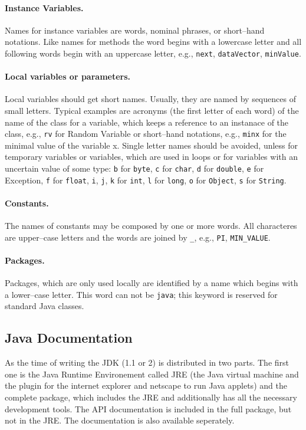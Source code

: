 \paragraph{Instance Variables.} Names for instance variables are
  words, nominal phrases, or short--hand notations. Like names for
  methods the word begins with a lowercase letter and all following
  words begin with an uppercase letter, e.g., \verb|next|,
  \verb|dataVector|,
\verb|minValue|.

\paragraph{Local variables or parameters.} Local variables should get
  short  names. Usually, they are named by sequences of small
  letters. Typical examples are acronyms (the first letter of each
  word) of the name of the class for a variable, which keeps a
  reference to an instanace of the class, e.g., \verb|rv| for Random
  Variable or short--hand notations, e.g., \verb|minx| for the minimal
  value of the variable x. Single letter names should be avoided,
  unless for temporary variables or variables, which are used in
  loops or for variables with an uncertain value of some type:
\verb|b| for \verb|byte|, \verb|c| for \verb|char|, \verb|d| for
  \verb|double|, \verb|e| for Exception, \verb|f| for \verb|float|,
  \verb|i|,
\verb|j|, \verb|k| for \verb|int|, \verb|l| for \verb|long|, \verb|o|
  for \verb|Object|, \verb|s| for \verb|String|.

\paragraph{Constants.} The names of constants may be composed by one
  or more words. All characteres are upper--case letters and the words
  are joined by \verb|_|, e.g., \verb|PI|,  \verb|MIN_VALUE|.

\paragraph{Packages.} Packages, which are only used locally are
  identified by a name which begins with a lower--case letter. This
  word can not be \verb|java|; this keyword is reserved for
  standard Java classes.



\subsection{Java Documentation}
As the time of writing the JDK (1.1 or 2) is distributed in
two parts. The first one is the Java Runtime Environement called JRE
(the Java virtual machine and the plugin for the internet explorer
and netscape to run Java applets) and the complete package,
which includes the JRE and additionally has all the necessary
development tools.
The API documentation is included in the full package, but not
in the JRE. The documentation is also available seperately.

